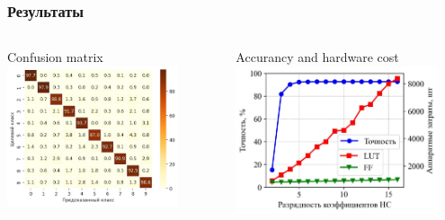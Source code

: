 \begin{frame}[t]
\frametitle{Результаты}
\begin{columns}
\hspace{5mm}
\begin{block}{Confusion matrix}
    \vspace{3mm}
    \includegraphics[width = 0.815\textwidth]{pics/cm_6q5.jpg} 
\end{block}
 
\begin{block}{Accurancy and hardware cost}
    \vspace{3mm}
    \includegraphics[width = 0.9\textwidth]{pics/Acc_LUTs_FFs.jpg} 
\end{block}

\end{columns}
\end{frame}

